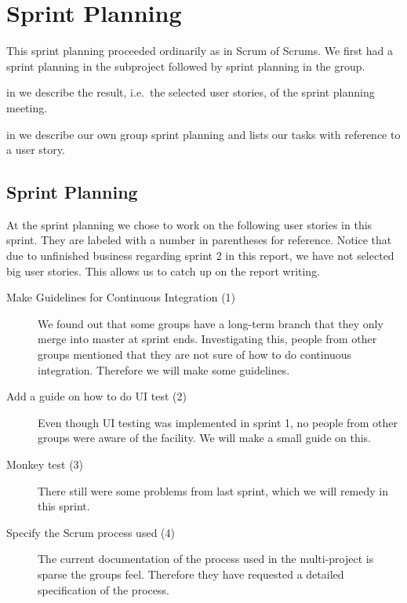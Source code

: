 \chapter{Sprint Planning}
This sprint planning proceeded ordinarily as in Scrum of Scrums. We first had a sprint planning in the subproject followed by sprint planning in the group.

\begin{chapterorganization}
  \item in  we describe the result, i.e.\ the selected user stories, of the \bd sprint planning meeting.
  \item in  we describe our own group sprint planning and lists our tasks with reference to a user story.
\end{chapterorganization}

\section{\bdtitle Sprint Planning}\label{sec:S3_bd}
At the \bd sprint planning we chose to work on the following user stories in this sprint. They are labeled with a number in parentheses for reference. Notice that due to unfinished business regarding sprint 2 in this report, we have not selected big user stories. This allows us to catch up on the report writing.

\begin{description}
  \item[Make Guidelines for Continuous Integration (1)] We found out that some groups have a long-term branch that they only merge into master at sprint ends. Investigating this, people from other groups mentioned that they are not sure of how to do continuous integration. Therefore we will make some guidelines.
  \item[Add a guide on how to do UI test (2)] Even though UI testing was implemented in sprint 1, no people from other groups were aware of the facility. We will make a small guide on this.
  \item[Monkey test (3)] There still were some problems from last sprint, which we will remedy in this sprint. 
  \item[Specify the Scrum process used (4)] The current documentation of the process used in the multi-project is sparse the groups feel. Therefore they have requested a detailed specification of the process.
\end{description}

